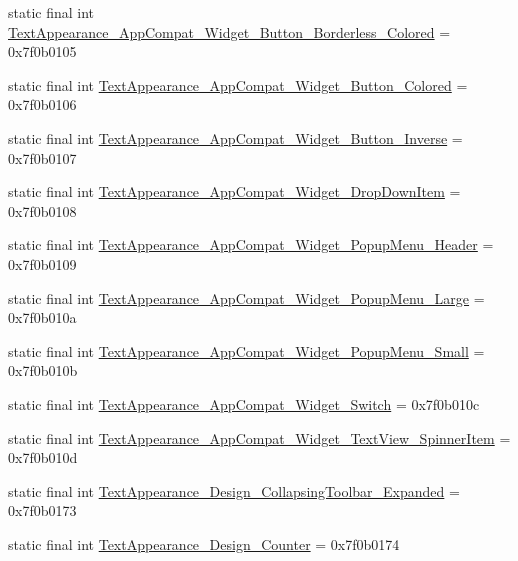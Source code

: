 \begin{CompactItemize}
\item 
static final int \hyperlink{classandroid_1_1support_1_1v7_1_1palette_1_1_r_1_1style_1bbf823be252c5567ccec5a8d9d14fa7}{TextAppearance\_\-AppCompat\_\-Widget\_\-Button\_\-Borderless\_\-Colored} = 0x7f0b0105
\item 
static final int \hyperlink{classandroid_1_1support_1_1v7_1_1palette_1_1_r_1_1style_a58e1a02e6ce09997bbba36530f92235}{TextAppearance\_\-AppCompat\_\-Widget\_\-Button\_\-Colored} = 0x7f0b0106
\item 
static final int \hyperlink{classandroid_1_1support_1_1v7_1_1palette_1_1_r_1_1style_ff10e6ba5954d6d29dbf07dc93401678}{TextAppearance\_\-AppCompat\_\-Widget\_\-Button\_\-Inverse} = 0x7f0b0107
\item 
static final int \hyperlink{classandroid_1_1support_1_1v7_1_1palette_1_1_r_1_1style_e3261d62dd29e2746b312875fda9a7fc}{TextAppearance\_\-AppCompat\_\-Widget\_\-DropDownItem} = 0x7f0b0108
\item 
static final int \hyperlink{classandroid_1_1support_1_1v7_1_1palette_1_1_r_1_1style_288da53b7a120e0692b8b8379bddcfc4}{TextAppearance\_\-AppCompat\_\-Widget\_\-PopupMenu\_\-Header} = 0x7f0b0109
\item 
static final int \hyperlink{classandroid_1_1support_1_1v7_1_1palette_1_1_r_1_1style_5f907d96841fd412afd0e31f2efacd6e}{TextAppearance\_\-AppCompat\_\-Widget\_\-PopupMenu\_\-Large} = 0x7f0b010a
\item 
static final int \hyperlink{classandroid_1_1support_1_1v7_1_1palette_1_1_r_1_1style_fb8b1fee7e99c56bedfe02316117f472}{TextAppearance\_\-AppCompat\_\-Widget\_\-PopupMenu\_\-Small} = 0x7f0b010b
\item 
static final int \hyperlink{classandroid_1_1support_1_1v7_1_1palette_1_1_r_1_1style_7400bf3a3d9b29bdb57b0b20fabb35b4}{TextAppearance\_\-AppCompat\_\-Widget\_\-Switch} = 0x7f0b010c
\item 
static final int \hyperlink{classandroid_1_1support_1_1v7_1_1palette_1_1_r_1_1style_a1e8457858bd693d3f50057b40731b55}{TextAppearance\_\-AppCompat\_\-Widget\_\-TextView\_\-SpinnerItem} = 0x7f0b010d
\item 
static final int \hyperlink{classandroid_1_1support_1_1v7_1_1palette_1_1_r_1_1style_1a94088a68b3e9c69c51af7d7399e52a}{TextAppearance\_\-Design\_\-CollapsingToolbar\_\-Expanded} = 0x7f0b0173
\item 
static final int \hyperlink{classandroid_1_1support_1_1v7_1_1palette_1_1_r_1_1style_30f3242a36362e69a898fd567d9c5a15}{TextAppearance\_\-Design\_\-Counter} = 0x7f0b0174

\end{CompactItemize}
